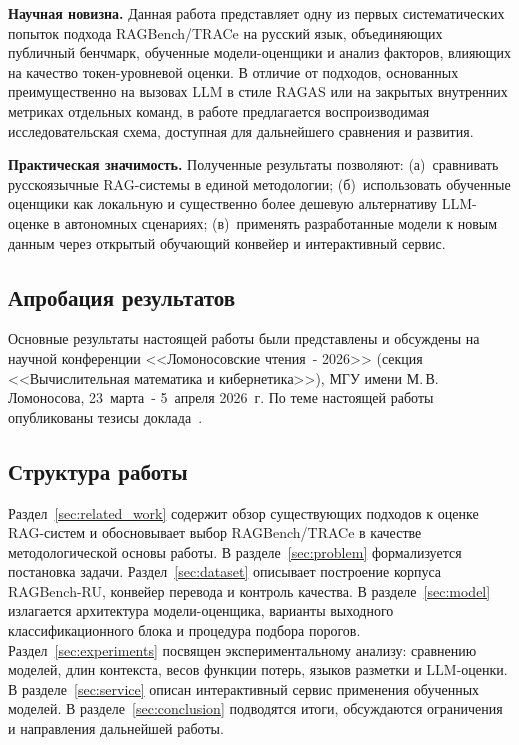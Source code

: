 \textbf{Научная новизна.} Данная работа представляет одну из первых систематических попыток
 подхода RAGBench/TRACe на русский язык, 
объединяющих публичный бенчмарк, обученные модели-оценщики и анализ  
факторов, влияющих на качество токен-уровневой оценки. В отличие от подходов,
 основанных преимущественно на
вызовах LLM в стиле RAGAS или на закрытых внутренних метриках отдельных команд, в работе
предлагается воспроизводимая исследовательская схема, доступная для дальнейшего сравнения
и развития.

\textbf{Практическая значимость.} Полученные результаты позволяют:
(а)~сравнивать русскоязычные RAG-системы в единой методологии;
(б)~использовать обученные оценщики как локальную и существенно более дешевую альтернативу
LLM-оценке в автономных сценариях;
(в)~применять разработанные модели к новым данным через открытый обучающий конвейер и
интерактивный сервис.

\subsection*{Апробация результатов}

Основные результаты настоящей работы были представлены и обсуждены
на научной конференции <<Ломоносовские чтения~- 2026>>
(секция <<Вычислительная математика и кибернетика>>),
МГУ имени М.\,В.\,Ломоносова, 23~марта~- 5~апреля 2026~г.
По теме настоящей работы опубликованы тезисы доклада~\cite{moiseev2026ragru}.

\subsection*{Структура работы}

Раздел~\ref{sec:related_work} содержит обзор существующих подходов к оценке RAG-систем и
обосновывает выбор RAGBench/TRACe в качестве методологической основы работы.
В разделе~\ref{sec:problem} формализуется постановка задачи.
Раздел~\ref{sec:dataset} описывает построение корпуса RAGBench-RU, конвейер перевода и
контроль качества.
В разделе~\ref{sec:model} излагается архитектура модели-оценщика, варианты
выходного классификационного блока и процедура подбора порогов.
Раздел~\ref{sec:experiments} посвящен экспериментальному анализу: сравнению моделей,
длин контекста, весов функции потерь, языков разметки и LLM-оценки.
В разделе~\ref{sec:service} описан интерактивный сервис применения обученных моделей.
В разделе~\ref{sec:conclusion} подводятся итоги, обсуждаются ограничения и направления
дальнейшей работы.
